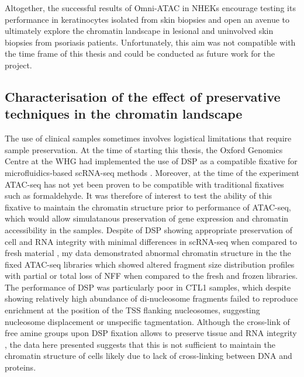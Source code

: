 Altogether, the successful results of Omni-ATAC in NHEKs encourage testing its performance in keratinocytes isolated from skin biopsies and open an avenue to ultimately explore the chromatin landscape in lesional and uninvolved skin biopsies from psoriasis patients. Unfortunately, this aim was not compatible with the time frame of this thesis and could be conducted as future work for the project.



\subsection{Characterisation of the effect of preservative techniques in the chromatin landscape}
The use of clinical samples sometimes involves logistical limitations that require sample preservation. At the time of starting this thesis, the Oxford Genomics Centre at the WHG had implemented the use of DSP as a compatible fixative for microfluidics-based scRNA-seq methods \parencite{Attar2018}. Moreover, at the time of the experiment ATAC-seq has not yet been proven to be compatible with traditional fixatives such as formaldehyde. It was therefore of interest to test the ability of this fixative to maintain the chromatin structure prior to performance of ATAC-seq, which would allow simulatanous preservation of gene expression and chromatin accessibility in the samples. Despite of DSP showing appropriate preservation of cell and RNA integrity with minimal differences in scRNA-seq when compared to fresh material \parencite{Attar2018}, my data demonstrated abnormal chromatin structure in the the fixed ATAC-seq libraries which showed altered fragment size distribution profiles with partial or total loss of NFF when compared to the fresh and frozen libraries. The performance of DSP was particularly poor in CTL1 samples, which despite showing relatively high abundance of di-nucleosome fragments failed to reproduce enrichment at the position of the TSS flanking nucleosomes, suggesting nucleosome displacement or unspecific tagmentation. Although the cross-link of free amine groups upon DSP fixation allows to preserve tissue and RNA integrity \parencite{Espina2013,Attar2018}, the data here presented suggests that this is not sufficient to maintain the chromatin structure of cells likely due to lack of cross-linking between DNA and proteins. 

